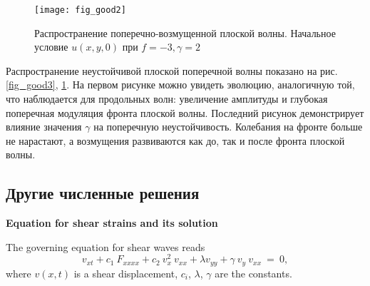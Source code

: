 \begin{figure}
	\centering
	\texttt{[image: fig\_good2]}
	\caption{Распространение поперечно-возмущенной плоской волны. Начальное условие $u(x,y,0)$ при $f = -3, \gamma = 2$} \label{fig_good2}
\end{figure}

Распространение неустойчивой плоской поперечной волны показано на рис. ~ \ref {fig_good3}, \ref{fig_good2}. На первом рисунке можно увидеть эволюцию, аналогичную той, что наблюдается для продольных волн: увеличение амплитуды и глубокая поперечная модуляция фронта плоской волны. Последний рисунок демонстрирует влияние значения $ \gamma $ на поперечную неустойчивость. Колебания на фронте больше не нарастают, а возмущения развиваются как до, так и после фронта плоской волны.



\subsection{Другие численные решения}
\textbf{Equation for shear strains and its solution}


The governing equation for shear waves reads \cite{PorKrOs, poosan20}
\begin{equation}
	v_{xt} +c_1~F_{xxxx}+ c_2~ v_{x}^2~ v_{xx}+\lambda v_{yy}+\gamma~v_{y}~ v_{xx}~=~0, \label{kpsh222}
\end{equation}
where $v(x,t)$ is a shear displacement, $c_i$, $\lambda$, $\gamma$ are the constants. 

